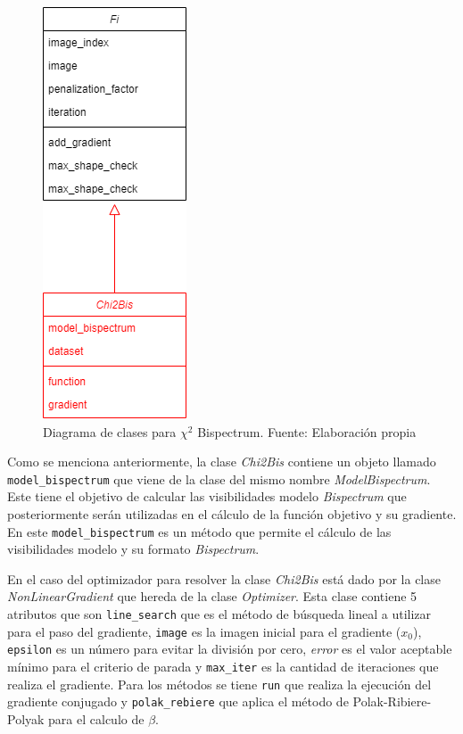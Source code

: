\begin{figure}[!ht]
	\centering
	\captionsetup{justification=centering}
	\includegraphics[scale=0.4]{images/Pyralysis-Bispectrum_Chi.png}
	\caption[Diagrama de clases para $\chi^2$ Bispectrum]{Diagrama de clases para $\chi^2$ Bispectrum. Fuente: Elaboración propia}
	\label{fig:bispectrumChi_diagram}
\end{figure}

Como se menciona anteriormente, la clase \textit{Chi2Bis} contiene un objeto llamado \texttt{model\_bispectrum} que viene de la clase del mismo nombre \textit{ModelBispectrum}. Este tiene el objetivo de calcular las visibilidades modelo \textit{Bispectrum} que posteriormente serán utilizadas en el cálculo de la función objetivo y su gradiente. En este \texttt{model\_bispectrum} es un método que permite el cálculo de las visibilidades modelo y su formato \textit{Bispectrum}. 

En el caso del optimizador para resolver la clase \textit{Chi2Bis} está dado por la clase \textit{NonLinearGradient} que hereda de la clase \textit{Optimizer}. Esta clase contiene 5 atributos que son \texttt{line\_search} que es el método de búsqueda lineal a utilizar para el paso del gradiente, \texttt{image} es la imagen inicial para el gradiente ($x_{0}$), \texttt{epsilon} es un número para evitar la división por cero, \textit{error} es el valor aceptable mínimo para el criterio de parada y \texttt{max\_iter} es la cantidad de iteraciones que realiza el gradiente. Para los métodos se tiene \texttt{run} que realiza la ejecución del gradiente conjugado y \texttt{polak\_rebiere} que aplica el método de Polak-Ribiere-Polyak para el calculo de $\beta$.

